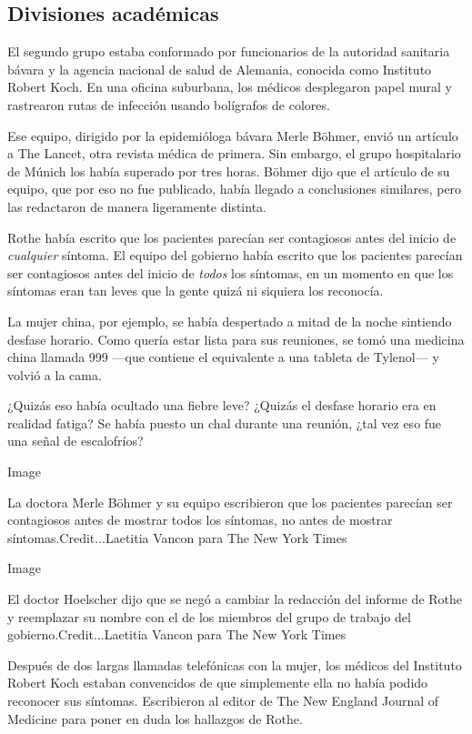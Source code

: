 \hypertarget{divisiones-acaduxe9micas}{%
\subsection{Divisiones académicas}\label{divisiones-acaduxe9micas}}

El segundo grupo estaba conformado por funcionarios de la autoridad
sanitaria bávara y la agencia nacional de salud de Alemania, conocida
como Instituto Robert Koch. En una oficina suburbana, los médicos
desplegaron papel mural y rastrearon rutas de infección usando
bolígrafos de colores.

Ese equipo, dirigido por la epidemióloga bávara Merle Böhmer, envió un
artículo a The Lancet, otra revista médica de primera. Sin embargo, el
grupo hospitalario de Múnich los había superado por tres horas. Böhmer
dijo que el artículo de su equipo, que por eso no fue publicado, había
llegado a conclusiones similares, pero las redactaron de manera
ligeramente distinta.

Rothe había escrito que los pacientes parecían ser contagiosos antes del
inicio de \emph{cualquier} síntoma. El equipo del gobierno había escrito
que los pacientes parecían ser contagiosos antes del inicio de
\emph{todos} los síntomas, en un momento en que los síntomas eran tan
leves que la gente quizá ni siquiera los reconocía.

La mujer china, por ejemplo, se había despertado a mitad de la noche
sintiendo desfase horario. Como quería estar lista para sus reuniones,
se tomó una medicina china llamada 999 ---que contiene el equivalente a
una tableta de Tylenol--- y volvió a la cama.

¿Quizás eso había ocultado una fiebre leve? ¿Quizás el desfase horario
era en realidad fatiga? Se había puesto un chal durante una reunión,
¿tal vez eso fue una señal de escalofríos?

Image

La doctora Merle Böhmer y su equipo escribieron que los pacientes
parecían ser contagiosos antes de mostrar todos los síntomas, no antes
de mostrar síntomas.Credit...Laetitia Vancon para The New York Times

Image

El doctor Hoelscher dijo que se negó a cambiar la redacción del informe
de Rothe y reemplazar su nombre con el de los miembros del grupo de
trabajo del gobierno.Credit...Laetitia Vancon para The New York Times

Después de dos largas llamadas telefónicas con la mujer, los médicos del
Instituto Robert Koch estaban convencidos de que simplemente ella no
había podido reconocer sus síntomas. Escribieron al editor de The New
England Journal of Medicine para poner en duda los hallazgos de Rothe.

